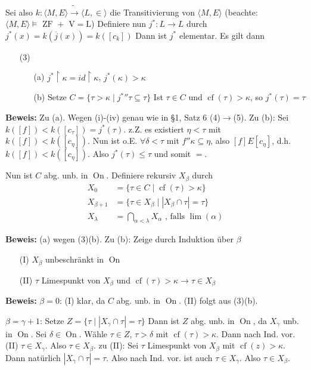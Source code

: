 \documentclass[a4paper,fontsize=11pt]{scrartcl}
\newcommand{\On}{\operatorname{On}}
\newcommand{\cf}{\operatorname{cf}}
\renewcommand{\bar}[1]{\overline{#1}}
\begin{document}
		Sei also $k\colon \langle M,E\rangle \tilde\to\langle L,\in\rangle$ die Transitivierung von $\langle M,E\rangle$ 
		(beachte: $\langle M,E\rangle\models \mbox{ ZF $+$ V$=$L}$)
		Definiere nun $j^*\colon L\to L$ durch $j^*(x)=k(\bar j(x))=k([c_k])$
		Dann ist $j^*$ elementar.
		Es gilt dann \begin{itemize}
			\item[(3)]\begin{itemize}
					\item[(a)] $j^*\upharpoonright\kappa=id\upharpoonright\kappa$, $j^*(\kappa)>\kappa$
					\item[(b)] Setze $C=\{\tau>\kappa\mid {j^{*}} ''\tau\subseteq\tau\}$
						Ist $\tau\in C$ und $\cf(\tau)>\kappa$, so $j^*(\tau)=\tau$
				\end{itemize}
		\end{itemize}
		{\bf Beweis:} Zu (a). Wegen (i)-(iv) genau wie in §1, Satz 6 (4)$\to$(5).
		Zu (b): Sei $k([f])<k([c_{\tau}])=j^*(\tau)$. 
		z.Z. es existiert $\eta<\tau$ mit $k([f])<k([c_{\eta}])$.
		Nun ist o.E. $\forall \delta<\tau$ mit $f''\kappa\subseteq \eta$, also $[f]E[c_{\eta}]$, d.h.
		$k([f])<k([c_{\eta}])$.
		Also $j^*(\tau)\le\tau$ und somit $=$.



		Nun ist $C$ abg. unb. in $\On$.
		Definiere rekursiv $X_{\beta}$ durch 
		\[\begin{array}{cc} X_0 &= \{\tau\in C\mid\cf(\tau)>\kappa\} \\
						X_{\beta+1} &= \{\tau\in X_{\beta}\mid |X_{\beta}\cap \tau|=\tau\} \\
						X_{\lambda} &= \bigcap_{\alpha<\lambda} X_{\alpha} \mbox{ , falls }\lim(\alpha) \end{array} \]

		{\bf Beweis:} (a) wegen (3)(b). Zu (b): Zeige durch Induktion über $\beta$
		\begin{itemize}
			\item[(I)] $X_{\beta}$ unbeschränkt in $\On$
			\item[(II)] $\tau$ Limespunkt von $X_{\beta}$ und $\cf(\tau)>\kappa\to \tau\in X_{\beta}$
		\end{itemize}

		{\bf Beweis:} $\beta=0$: (I) klar, da $C$ abg. unb. in $\On$. (II) folgt aus (3)(b).

			$\beta=\gamma+1$: Setze $Z=\{\tau\mid |X_{\gamma}\cap\tau|=\tau\}$ 
			Dann ist $Z$ abg. unb. in $\On$, da $X_{\gamma}$ unb. in $\On$. 
			Sei $\delta\in\On$.
			Wähle $\tau\in Z$, $\tau>\delta$ mit $\cf(\tau)>\kappa$. 
			Dann nach Ind. vor. (II) $\tau\in X_{\gamma}$.
			Also $\tau\in X_{\beta}$.
			zu (II): Sei $\tau$ Limespunkt von $X_{\beta}$ mit $\cf(z)>\kappa$.
			Dann natürlich $|X_{\gamma}\cap\tau|=\tau$.
			Also nach Ind. vor. ist auch $\tau\in X_{\gamma}$.
			Also $\tau\in X_{\beta}$.
			
\end{document}
